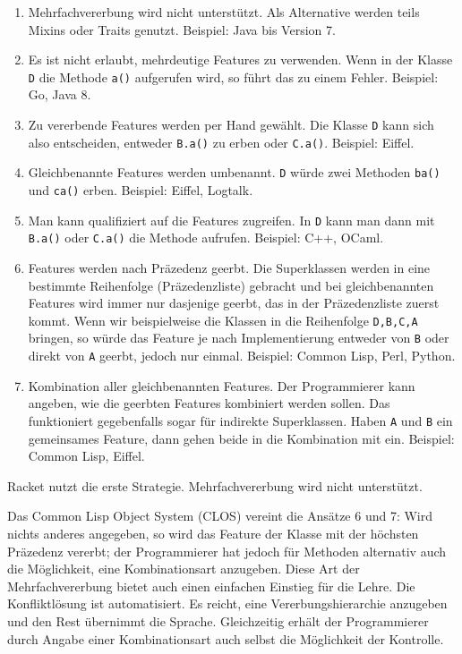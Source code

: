 \begin{enumerate}
 \item Mehrfachvererbung wird nicht unterstützt. Als Alternative werden teils Mixins oder Traits genutzt. Beispiel: Java bis Version 7.
 \item Es ist nicht erlaubt, mehrdeutige Features zu verwenden. Wenn in der Klasse \texttt{D} die Methode \texttt{a()} aufgerufen wird, so führt das zu einem Fehler. Beispiel: Go, Java 8.
 \item Zu vererbende Features werden per Hand gewählt. Die Klasse \texttt{D} kann sich also entscheiden, entweder \texttt{B.a()} zu erben oder \texttt{C.a()}. Beispiel: Eiffel.
 \item Gleichbenannte Features werden umbenannt. \texttt{D} würde zwei Methoden \texttt{ba()} und \texttt{ca()} erben. Beispiel: Eiffel, Logtalk.
 \item Man kann qualifiziert auf die Features zugreifen. In \texttt{D} kann man dann mit \texttt{B.a()} oder \texttt{C.a()} die Methode aufrufen. Beispiel: C++, OCaml.
 \item Features werden nach Präzedenz geerbt. Die Superklassen werden in eine bestimmte Reihenfolge (Präzedenzliste) gebracht und bei gleichbenannten Features wird immer nur dasjenige geerbt, das in der Präzedenzliste zuerst kommt. Wenn wir beispielweise die Klassen in die Reihenfolge \texttt{D,B,C,A} bringen, so würde das Feature je nach Implementierung entweder von \texttt{B} oder direkt von \texttt{A} geerbt, jedoch nur einmal. Beispiel: Common Lisp, Perl, Python.
 \item Kombination aller gleichbenannten Features. Der Programmierer kann angeben, wie die geerbten Features kombiniert werden sollen. Das funktioniert gegebenfalls sogar für indirekte Superklassen. Haben \texttt{A} und \texttt{B} ein gemeinsames Feature, dann gehen beide in die Kombination mit ein. Beispiel: Common Lisp, Eiffel.
\end{enumerate}


Racket nutzt die erste Strategie. Mehrfachvererbung wird nicht unterstützt.

Das Common Lisp Object System (CLOS) \cite{keene} vereint die Ansätze 6 und 7: Wird nichts anderes angegeben, so wird das Feature der Klasse mit der höchsten Präzedenz vererbt; der Programmierer hat jedoch für Methoden alternativ auch die Möglichkeit, eine Kombinationsart anzugeben. Diese Art der Mehrfachvererbung bietet auch einen einfachen Einstieg für die Lehre. Die Konfliktlösung ist automatisiert. Es reicht, eine Vererbungshierarchie anzugeben und den Rest übernimmt die Sprache. Gleichzeitig erhält der Programmierer durch Angabe einer Kombinationsart auch selbst die Möglichkeit der Kontrolle.

